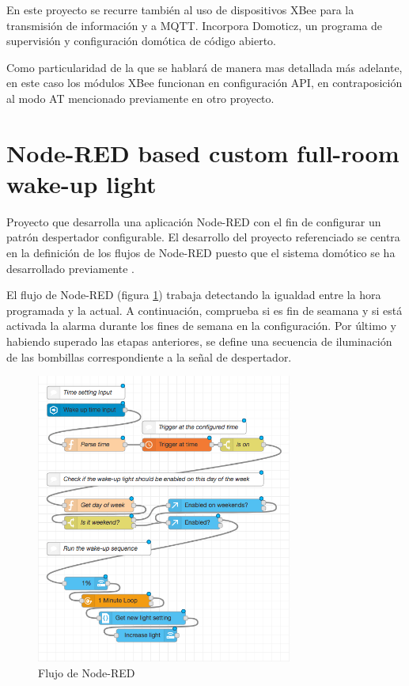 En este proyecto se recurre también al uso de dispositivos XBee para la transmisión de información y a MQTT. Incorpora Domoticz, un programa de supervisión y configuración domótica de código abierto.

Como particularidad de la que se hablará de manera mas detallada más adelante, en este caso los módulos XBee funcionan en configuración API, en contraposición al modo AT mencionado previamente en otro proyecto.

\section{Node-RED based custom full-room wake-up light \cite{Bulten:2019}}

Proyecto que desarrolla una aplicación Node-RED con el fin de configurar un patrón despertador configurable. El desarrollo del proyecto referenciado \cite{Bulten:2019} se centra en la definición de los flujos de Node-RED puesto que el sistema domótico se ha desarrollado previamente \cite{Bulten:2018}.

El flujo de Node-RED (figura \ref{fig:EArte7}) trabaja detectando la igualdad entre la hora programada y la actual. A continuación, comprueba si es fin de seamana y si está activada la alarma durante los fines de semana en la configuración. Por último y habiendo superado las etapas anteriores, se define una secuencia de iluminación de las bombillas correspondiente a la señal de despertador.

\begin{figure}[tb]
\centering
\includegraphics[width=0.75\textwidth]{figuras/EArte7.png}
\caption{Flujo de Node-RED}
\label{fig:EArte7}
\end{figure}

